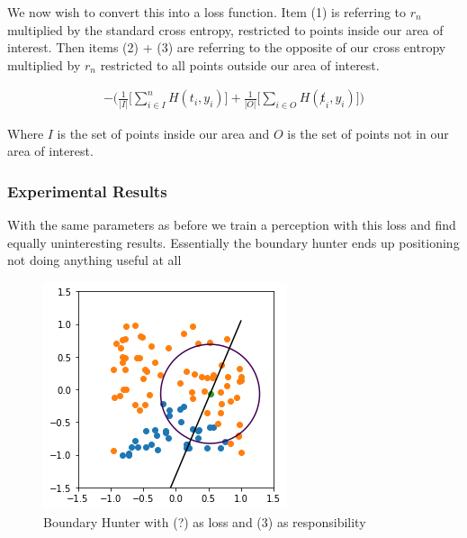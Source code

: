 \documentclass{article}
\begin{document}
We now wish to convert this into a loss function. Item (1) is referring to $r_n$ multiplied by the standard cross entropy, restricted to points inside our area of interest. Then items (2) + (3) are referring to the opposite of our cross entropy multiplied by $r_n$ restricted to all points outside our area of interest.

\begin{align}
- \big( \frac{1}{|I|} \big[ \sum_{i \in I}^n H(t_i, y_i) \big] + \frac{1}{|O|} \big[ \sum_{i \in O} H(\not t_i, y_i) \big] \big)
\end{align}

Where $I$ is the set of points inside our area and $O$ is the set of points not in our area of interest.

\subsubsection{Experimental Results}

With the same parameters as before we train a perception with this loss and find equally uninteresting results. Essentially the boundary hunter ends up positioning not doing anything useful at all

\begin{figure}[H]
\centering
  \begin{minipage}[b]{0.4\textwidth}
    \includegraphics[width=\textwidth]{BoundaryHunter-Attempt2-01.png}
    \caption{Boundary Hunter with (?) as loss and (3) as responsibility}
  \end{minipage}
  \hfill
\end{figure}
\end{document}
